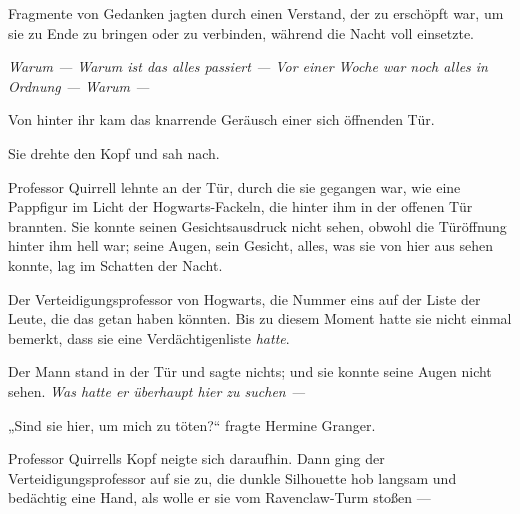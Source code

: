 Fragmente von Gedanken jagten durch einen Verstand, der zu erschöpft war, um sie zu Ende zu bringen oder zu verbinden, während die Nacht voll einsetzte.




\emph{Warum — Warum ist das alles passiert — Vor einer Woche war noch alles in Ordnung — Warum —}

Von hinter ihr kam das knarrende Geräusch einer sich öffnenden Tür.

Sie drehte den Kopf und sah nach.

Professor Quirrell lehnte an der Tür, durch die sie gegangen war, wie eine Pappfigur im Licht der Hogwarts-Fackeln, die hinter ihm in der offenen Tür brannten. Sie konnte seinen Gesichtsausdruck nicht sehen, obwohl die Türöffnung hinter ihm hell war; seine Augen, sein Gesicht, alles, was sie von hier aus sehen konnte, lag im Schatten der Nacht.

Der Verteidigungsprofessor von Hogwarts, die Nummer eins auf der Liste der Leute, die das getan haben könnten. Bis zu diesem Moment hatte sie nicht einmal bemerkt, dass sie eine Verdächtigenliste \emph{hatte}.

Der Mann stand in der Tür und sagte nichts; und sie konnte seine Augen nicht sehen. \emph{Was hatte er überhaupt hier zu suchen —}

„Sind sie hier, um mich zu töten?“ fragte Hermine Granger.

Professor Quirrells Kopf neigte sich daraufhin.
%
Dann ging der Verteidigungsprofessor auf sie zu, die dunkle Silhouette hob langsam und bedächtig eine Hand, als wolle er sie vom Ravenclaw-Turm stoßen —


